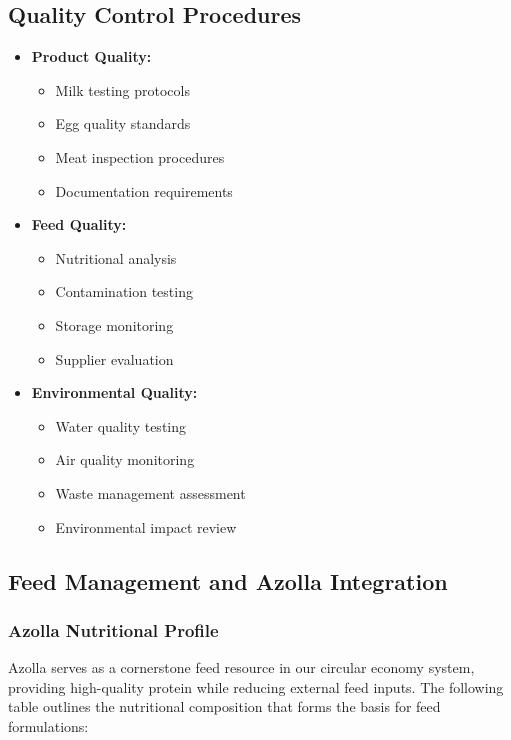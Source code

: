 \subsection{Quality Control Procedures}
\begin{itemize}
    \item \textbf{Product Quality:}
    \begin{itemize}
        \item Milk testing protocols
        \item Egg quality standards
        \item Meat inspection procedures
        \item Documentation requirements
    \end{itemize}
    
    \item \textbf{Feed Quality:}
    \begin{itemize}
        \item Nutritional analysis
        \item Contamination testing
        \item Storage monitoring
        \item Supplier evaluation
    \end{itemize}
    
    \item \textbf{Environmental Quality:}
    \begin{itemize}
        \item Water quality testing
        \item Air quality monitoring
        \item Waste management assessment
        \item Environmental impact review
    \end{itemize}
\end{itemize}

\subsection{Feed Management and Azolla Integration}
\label{sec:feed_management}

\subsubsection{Azolla Nutritional Profile}
\label{sec:azolla_nutrition}

Azolla serves as a cornerstone feed resource in our circular economy system, providing high-quality protein while reducing external feed inputs. The following table outlines the nutritional composition that forms the basis for feed formulations:


